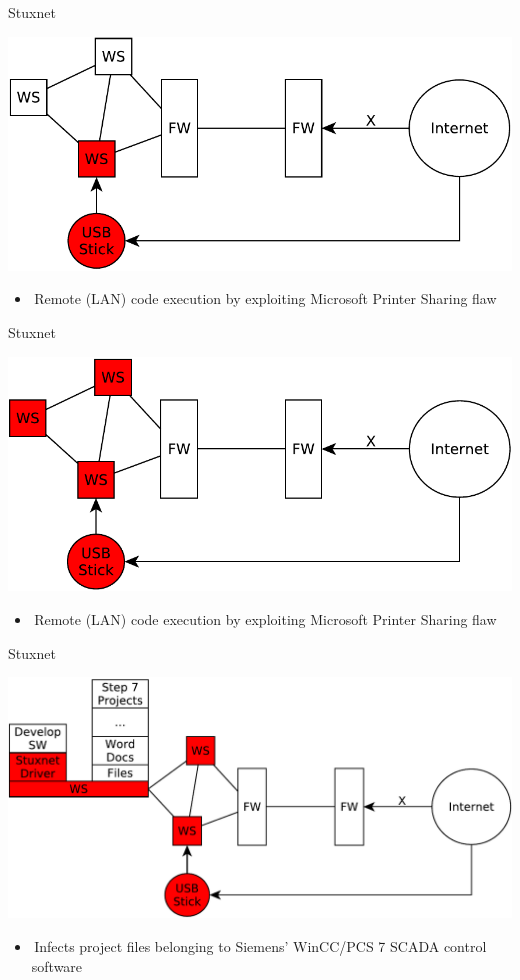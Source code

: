 \documentclass{beamer}
\begin{document}
\begin{frame}{Stuxnet}
  \begin{center}
    \includegraphics[width=0.7\linewidth]{stuxnet3}
    \begin{itemize}
    \item Remote (LAN) code execution by exploiting Microsoft Printer
      Sharing flaw
    \end{itemize}
  \end{center}
\end{frame}


\begin{frame}{Stuxnet}
  \begin{center}
    \includegraphics[width=0.7\linewidth]{stuxnet4}
    \begin{itemize}
    \item Remote (LAN) code execution by exploiting Microsoft Printer
      Sharing flaw
    \end{itemize}
  \end{center}
\end{frame}

\begin{frame}{Stuxnet}
  \begin{center}
    \includegraphics[width=0.7\linewidth]{stuxnet5}
    \begin{itemize}
    \item Infects project files belonging to Siemens' WinCC/PCS 7 SCADA control software
    \end{itemize}
  \end{center}
\end{frame}
\end{document}
